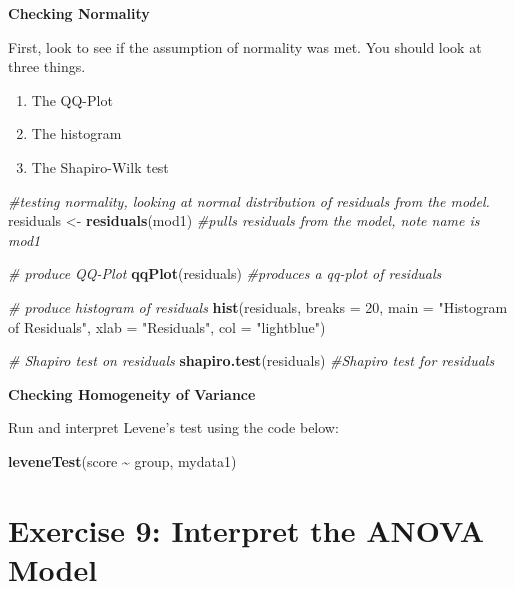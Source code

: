 \documentclass[
]{book}
\newenvironment{Shaded}{\begin{snugshade}}{\end{snugshade}}
\newcommand{\AttributeTok}[1]{\textcolor[rgb]{0.13,0.29,0.53}{#1}}
\newcommand{\CommentTok}[1]{\textcolor[rgb]{0.56,0.35,0.01}{\textit{#1}}}
\newcommand{\DecValTok}[1]{\textcolor[rgb]{0.00,0.00,0.81}{#1}}
\newcommand{\FunctionTok}[1]{\textcolor[rgb]{0.13,0.29,0.53}{\textbf{#1}}}
\newcommand{\NormalTok}[1]{#1}
\newcommand{\OtherTok}[1]{\textcolor[rgb]{0.56,0.35,0.01}{#1}}
\newcommand{\SpecialCharTok}[1]{\textcolor[rgb]{0.81,0.36,0.00}{\textbf{#1}}}
\newcommand{\StringTok}[1]{\textcolor[rgb]{0.31,0.60,0.02}{#1}}
\providecommand{\tightlist}{%
  \setlength{\itemsep}{0pt}\setlength{\parskip}{0pt}}
\let\oldsection\section
\renewcommand{\section}{\needspace{5\baselineskip}\oldsection}
\begin{document}
\textbf{Checking Normality}

First, look to see if the assumption of normality was met. You should look at three things.

\begin{enumerate}
\def\labelenumi{\arabic{enumi})}
\tightlist
\item
  The QQ-Plot
\item
  The histogram
\item
  The Shapiro-Wilk test
\end{enumerate}

\begin{Shaded}
\begin{Highlighting}[]
\CommentTok{\#testing normality, looking at normal distribution of residuals from the model.}
\NormalTok{residuals }\OtherTok{\textless{}{-}} \FunctionTok{residuals}\NormalTok{(mod1) }\CommentTok{\#pulls residuals from the model, note name is \textasciigrave{}mod1\textasciigrave{}}

\CommentTok{\# produce QQ{-}Plot}
\FunctionTok{qqPlot}\NormalTok{(residuals) }\CommentTok{\#produces a qq{-}plot of residuals}

\CommentTok{\# produce histogram of residuals}
\FunctionTok{hist}\NormalTok{(residuals, }\AttributeTok{breaks =} \DecValTok{20}\NormalTok{, }\AttributeTok{main =} \StringTok{"Histogram of Residuals"}\NormalTok{, }\AttributeTok{xlab =} \StringTok{"Residuals"}\NormalTok{, }\AttributeTok{col =} \StringTok{"lightblue"}\NormalTok{) }

\CommentTok{\# Shapiro test on residuals}
\FunctionTok{shapiro.test}\NormalTok{(residuals) }\CommentTok{\#Shapiro test for residuals}
\end{Highlighting}
\end{Shaded}

\textbf{Checking Homogeneity of Variance}

Run and interpret Levene's test using the code below:

\begin{Shaded}
\begin{Highlighting}[]
\FunctionTok{leveneTest}\NormalTok{(score }\SpecialCharTok{\textasciitilde{}}\NormalTok{ group, mydata1)}
\end{Highlighting}
\end{Shaded}

\section{Exercise 9: Interpret the ANOVA Model}\label{exercise-9-interpret-the-anova-model}
\end{document}
